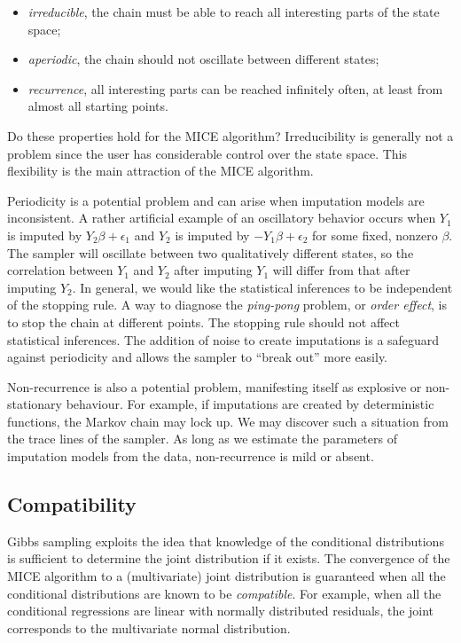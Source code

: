 \documentclass[
]{book}
\providecommand{\tightlist}{%
  \setlength{\itemsep}{0pt}\setlength{\parskip}{0pt}}
\begin{document}
\begin{itemize}
\tightlist
\item
  \emph{irreducible}, the chain must be able to reach all interesting
  parts of the state space;
\item
  \emph{aperiodic}, the chain should not oscillate between different
  states;
\item
  \emph{recurrence}, all interesting parts can be reached infinitely
  often, at least from almost all starting points.
\end{itemize}

Do these properties hold for the MICE algorithm? Irreducibility is generally not a problem since the user has considerable control over the state space. This flexibility is the main attraction of the MICE algorithm.

Periodicity is a potential problem and can arise when imputation models are inconsistent. A rather artificial example of an oscillatory behavior occurs when \(Y_1\) is imputed by \(Y_2\beta+\epsilon_1\) and \(Y_2\) is imputed by \(-Y_1\beta+\epsilon_2\) for some fixed, nonzero \(\beta\). The sampler will oscillate between two qualitatively different states, so the correlation between \(Y_1\) and \(Y_2\) after imputing \(Y_1\) will differ from that after imputing \(Y_2\). In general, we would like the statistical inferences to be independent of the stopping rule. A way to diagnose the \emph{ping-pong} problem, or \emph{order effect}, is to stop the chain at different points. The stopping rule should not affect statistical inferences. The addition of noise to create imputations is a safeguard against periodicity and allows the sampler to ``break out'' more easily.

Non-recurrence is also a potential problem, manifesting itself as explosive or non-stationary behaviour. For example, if imputations are created by deterministic functions, the Markov chain may lock up. We may discover such a situation from the trace lines of the sampler. As long as we estimate the parameters of imputation models from the data, non-recurrence is mild or absent.

\subsection{Compatibility}\label{compatibility}

Gibbs sampling exploits the idea that knowledge of the conditional distributions is sufficient to determine the joint distribution if it exists. The convergence of the MICE algorithm to a (multivariate) joint distribution is guaranteed when all the conditional distributions are known to be \emph{compatible}. For example, when all the conditional regressions are linear with normally distributed residuals, the joint corresponds to the multivariate normal distribution.
\end{document}
